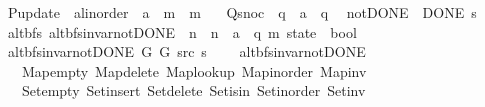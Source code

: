 \begin{isabellebody}
\ \ P{\isacharunderscore}{\kern0pt}update\ {\isacharcolon}{\kern0pt}{\isacharcolon}{\kern0pt}\ {\isachardoublequoteopen}{\isacharprime}{\kern0pt}a{\isacharcolon}{\kern0pt}{\isacharcolon}{\kern0pt}linorder\ {\isasymRightarrow}\ {\isacharprime}{\kern0pt}a\ {\isasymRightarrow}\ {\isacharprime}{\kern0pt}m\ {\isasymRightarrow}\ {\isacharprime}{\kern0pt}m{\isachardoublequoteclose}\ \isanewline
\ \ Q{\isacharunderscore}{\kern0pt}snoc\ {\isacharcolon}{\kern0pt}{\isacharcolon}{\kern0pt}\ {\isachardoublequoteopen}{\isacharprime}{\kern0pt}q\ {\isasymRightarrow}\ {\isacharprime}{\kern0pt}a\ {\isasymRightarrow}\ {\isacharprime}{\kern0pt}q{\isachardoublequoteclose}\ {\isacharplus}{\kern0pt}\isanewline
{}\ not{\isacharunderscore}{\kern0pt}DONE{\isacharcolon}{\kern0pt}\ {\isachardoublequoteopen}{\isasymnot}\ DONE\ s{\isachardoublequoteclose}\isanewline
%
\isadeliminvisible
\isanewline
%
\endisadeliminvisible
%
\isataginvisible
{}\isamarkupfalse%
\ {\isacharparenleft}{\kern0pt}\ alt{\isacharunderscore}{\kern0pt}bfs{\isacharparenright}{\kern0pt}\ alt{\isacharunderscore}{\kern0pt}bfs{\isacharunderscore}{\kern0pt}invar{\isacharunderscore}{\kern0pt}not{\isacharunderscore}{\kern0pt}DONE{\isacharprime}{\kern0pt}\ {\isacharcolon}{\kern0pt}{\isacharcolon}{\kern0pt}\ {\isachardoublequoteopen}{\isacharprime}{\kern0pt}n\ {\isasymRightarrow}\ {\isacharprime}{\kern0pt}n\ {\isasymRightarrow}\ {\isacharprime}{\kern0pt}a\ {\isasymRightarrow}\ {\isacharparenleft}{\kern0pt}{\isacharprime}{\kern0pt}q{\isacharcomma}{\kern0pt}\ {\isacharprime}{\kern0pt}m{\isacharparenright}{\kern0pt}\ state\ {\isasymRightarrow}\ bool{\isachardoublequoteclose}\ \isanewline
\ \ {\isachardoublequoteopen}alt{\isacharunderscore}{\kern0pt}bfs{\isacharunderscore}{\kern0pt}invar{\isacharunderscore}{\kern0pt}not{\isacharunderscore}{\kern0pt}DONE{\isacharprime}{\kern0pt}\ G{}\ G{}\ src\ s\ {\isasymequiv}\isanewline
\ \ \ alt{\isacharunderscore}{\kern0pt}bfs{\isacharunderscore}{\kern0pt}invar{\isacharunderscore}{\kern0pt}not{\isacharunderscore}{\kern0pt}DONE\isanewline
\ \ \ \ Map{\isacharunderscore}{\kern0pt}empty\ Map{\isacharunderscore}{\kern0pt}delete\ Map{\isacharunderscore}{\kern0pt}lookup\ Map{\isacharunderscore}{\kern0pt}inorder\ Map{\isacharunderscore}{\kern0pt}inv\isanewline
\ \ \ \ Set{\isacharunderscore}{\kern0pt}empty\ Set{\isacharunderscore}{\kern0pt}insert\ Set{\isacharunderscore}{\kern0pt}delete\ Set{\isacharunderscore}{\kern0pt}isin\ Set{\isacharunderscore}{\kern0pt}inorder\ Set{\isacharunderscore}{\kern0pt}inv\isanewline

\end{isabellebody}
